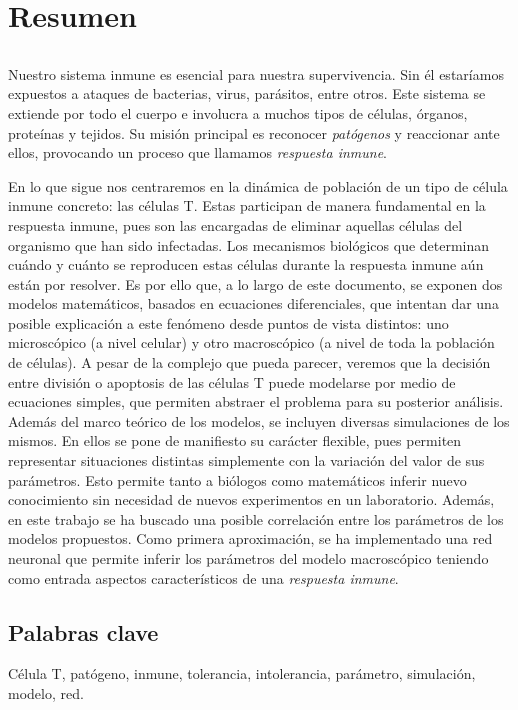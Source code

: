 \chapter*{Resumen}

\section*{\tituloPortadaVal}

Nuestro sistema inmune es esencial para nuestra supervivencia. Sin él estaríamos expuestos a ataques de bacterias, virus, parásitos, entre otros. Este sistema se extiende por todo el cuerpo e involucra a muchos tipos de células, órganos, proteínas y tejidos. Su misión principal es reconocer \textit{patógenos} y reaccionar ante ellos, provocando un proceso que llamamos \textit{respuesta inmune}. 

En lo que sigue nos centraremos en la dinámica de población de un tipo de célula inmune concreto: las células T. Estas participan de manera fundamental en la respuesta inmune, pues son las encargadas de eliminar aquellas células del organismo que han sido infectadas. Los mecanismos biológicos que determinan cuándo y cuánto se reproducen estas células durante la respuesta inmune aún están por resolver. Es por ello que, a lo largo de este documento, se exponen dos modelos matemáticos, basados en ecuaciones diferenciales, que intentan dar una posible explicación a este fenómeno desde puntos de vista distintos: uno microscópico (a nivel celular) y otro macroscópico (a nivel de toda la población de células). A pesar de la complejo que pueda parecer, veremos que la decisión entre división o apoptosis de las células T puede modelarse por medio de ecuaciones simples, que permiten abstraer el problema para su posterior análisis. Además del marco teórico de los modelos, se incluyen diversas simulaciones de los mismos. En ellos se pone de manifiesto su carácter flexible, pues permiten representar situaciones distintas simplemente con la variación del valor de sus parámetros. Esto permite tanto a biólogos como matemáticos inferir nuevo conocimiento sin necesidad de nuevos experimentos en un laboratorio. Además, en este trabajo se ha buscado una posible correlación entre los parámetros de los modelos propuestos. Como primera aproximación, se ha implementado una red neuronal que permite inferir los parámetros del modelo macroscópico teniendo como entrada aspectos característicos de una \textit{respuesta inmune}.



\section*{Palabras clave}
   

\noindent Célula T, patógeno, inmune, tolerancia, intolerancia, parámetro, simulación, modelo, red.

   


